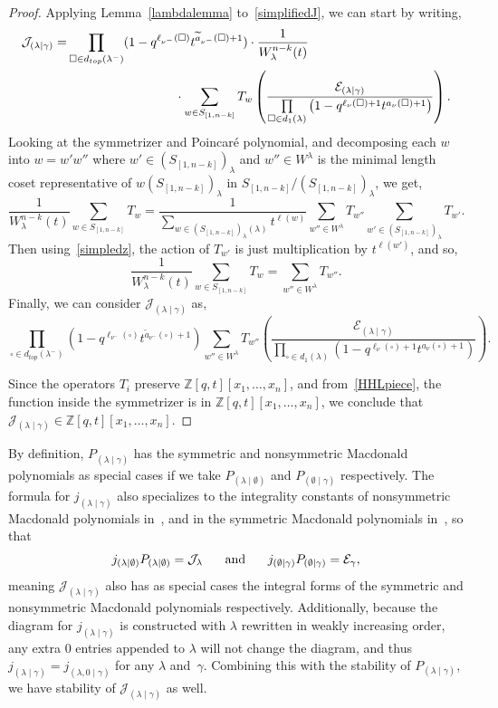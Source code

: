 \documentclass[ALCO]{cedram}
\newcommand{\Z}{\mathbb{Z}}
\newcommand{\Sn}{S_{[1,n-k]}}
\newcommand{\Stabn}{(S_{[1,n-k]})_\lambda}
\newcommand{\Symm}[1]{\sum\limits_{w\in \Sn} T_w \left( #1 \right)}
\newcommand{\PP}{P_{(\lambda \mid \gamma)}}
\newcommand{\JJ}{\mathcal{J}_{(\lambda \mid \gamma)}}
\newcommand{\nudom}{{( \lambda \mid \gamma )}}
\newcommand{\lambdagamma}{{\nudom}}
\newcommand{\jj}{j_{(\lambda \mid \gamma)}}
\newcommand{\legnu}{{\ell_\nu(\square)}}
\newcommand{\legnumin}{{\ell_{\nu^-}(\square)}}
\newcommand{\armonenumin}{{\widetilde{a}_{\nu^-}(\square)}}
\newcommand{\armtwonu}{{a_\nu(\square)}}
\begin{document}
\begin{proof} 
Applying Lemma~\ref{lambdalemma} to~\eqref{simplifiedJ}, we can start by writing,
\begin{align*}  \JJ =  &\prod\limits_{\square \in d_{top}(\lambda^-)} (1-q^{\legnumin} t^{\armonenumin + 1}) \cdot \frac{1}{W^{n-k}_\lambda(t)} \\ & \hspace*{3cm}\cdot \Symm{\frac{\mathcal{E}_{(\lambda \mid \gamma)}}{\prod\limits_{\square \in d_1(\lambda)} \left(1-q^{\legnu+1}t^{\armtwonu +1} \right)}} . \end{align*}
 Looking at the symmetrizer and Poincar\'e polynomial, and decomposing each $w$ into $w=w'w''$ where $w'\in \Stabn$ and $w'' \in W^{\lambda}$ is the minimal length coset representative of $w\Stabn$ in $\Sn / \Stabn$, we get,
\[ \frac{1}{W^{n-k}_\lambda(t)} \sum\limits_{w\in \Sn} T_w = \frac{1}{\sum\limits_{w\in \Stabn(\lambda)} t^{\ell(w)}} \sum\limits_{w''\in W^\lambda}T_{w''} \sum\limits_{w'\in \Stabn}T_{w'}. \]
Then using~\eqref{simpledz}, the action of $T_{w'}$ is just multiplication by $t^{\ell(w')}$, and so,
\[ \frac{1}{W^{n-k}_\lambda(t)} \sum\limits_{w\in \Sn} T_w = \sum\limits_{w''\in W^\lambda}T_{w''}. \]
Finally, we can consider $\JJ$ as,
\[ \prod\limits_{\square \in d_{top}(\lambda^-)} (1-q^{\legnumin} t^{\armonenumin + 1})  \sum\limits_{w''\in W^\lambda}T_{w''}  \left(\frac{\mathcal{E}_{(\lambda \mid \gamma)}}{\prod\limits_{\square \in d_1(\lambda)} \left(1-q^{\legnu+1}t^{\armtwonu +1} \right)} \right).\]

Since the operators $T_i$ preserve $\Z[q,t][x_1,\dotsc,x_n]$, and from~\eqref{HHLpiece}, the function inside the symmetrizer is in $\Z[q,t][x_1,\dotsc,x_n]$, we conclude that $\JJ \in \Z[q,t][x_1,\dotsc,x_n]$.
\end{proof}

 By definition, $P_{\lambdagamma}$ has the symmetric and nonsymmetric Macdonald polynomials as special cases if we take $P_{(\lambda \mid \emptyset)}$ and $P_{(\emptyset \mid \gamma)}$ respectively. The formula for $\jj$ also specializes to the integrality constants of nonsymmetric Macdonald polynomials in~\cite{MR3443860}, and in the symmetric Macdonald polynomials in~\cite[section VI.8]{MR1427661}, so that
\[ j_{(\lambda \mid \emptyset)} P_{(\lambda \mid \emptyset)} = \mathcal{J}_\lambda \hspace{.5cm} \text{ and } \hspace{.5cm}  j_{(\emptyset \mid \gamma)} P_{(\emptyset \mid \gamma)} = \mathcal{E}_\gamma,\]
meaning $\JJ$ also has as special cases the integral forms of the symmetric and nonsymmetric Macdonald polynomials respectively. Additionally, because the diagram for $\jj$ is constructed with $\lambda$ rewritten in weakly increasing order, any extra 0 entries appended to $\lambda$ will not change the diagram, and thus $j_{(\lambda \mid \gamma)} = j_{(\lambda, 0 \mid \gamma)}$ for any $\lambda$ and~$\gamma$. Combining this with the stability of $\PP$, we have stability of $\JJ$ as well.
\end{document}
